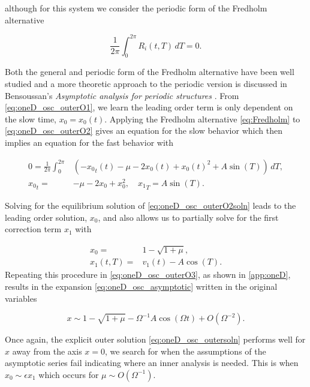 although for this system we consider the periodic form of the Fredholm alternative

\begin{equation} \label{eq:Fredholm}
\frac{1}{2\pi}\int_0^{2\pi}R_i(t,T)\,dT=0.
\end{equation}

\indent Both the general and periodic form of the Fredholm alternative have been well studied and a more theoretic approach to the periodic version is discussed in Bensoussan's \textit{Asymptotic analysis for periodic structures} \cite{bensoussan2011asymptotic}. From \eqref{eq:oneD_osc_outerO1}, we learn the leading order term is only dependent on the slow time, $x_0=x_0(t)$. Applying the Fredholm alternative \eqref{eq:Fredholm} to \eqref{eq:oneD_osc_outerO2} gives an equation for the slow behavior which then implies an equation for the fast behavior with

\begin{equation}\label{eq:oneD_osc_outerO2soln}
\begin{aligned}
0=\frac{1}{2\pi}\int_0^{2\pi}&\left( -{x_0}_t(t) -\mu -2x_0(t)+x_0(t)^2+A\sin(T)\right)\,dT ,\\
{x_0}_t=& -\mu -2x_0+x_0^2 , \quad{x_1}_T = A\sin(T).
\end{aligned}
\end{equation}

Solving for the equilibrium solution of \eqref{eq:oneD_osc_outerO2soln} leads to the leading order solution, $x_0$, and also allows us to partially solve for the first correction term $x_1$ with

\begin{equation*}
\begin{aligned}
x_0 =& 1-\sqrt{1+\mu},\\
x_1(t,T) =& v_1(t) - A\cos(T).
\end{aligned}
\end{equation*}
Repeating this procedure in \eqref{eq:oneD_osc_outerO3}, as shown in \autoref{app:oneD}, results in the expansion \eqref{eq:oneD_osc_asymptotic} written in the original variables

\begin{equation}\label{eq:oneD_osc_outersoln}
x\sim 1-\sqrt{1+\mu}-\Omega^{-1} A \cos(\Omega t)+O(\Omega^{-2}).
\end{equation}

Once again, the explicit outer solution \eqref{eq:oneD_osc_outersoln} performs well for $x$ away from the axis $x=0$, we search for when the assumptions of the asymptotic series fail indicating where an inner analysis is needed. This is when $x_0\sim \epsilon x_1$ which occurs for $\mu\sim O(\Omega^{-1})$.

